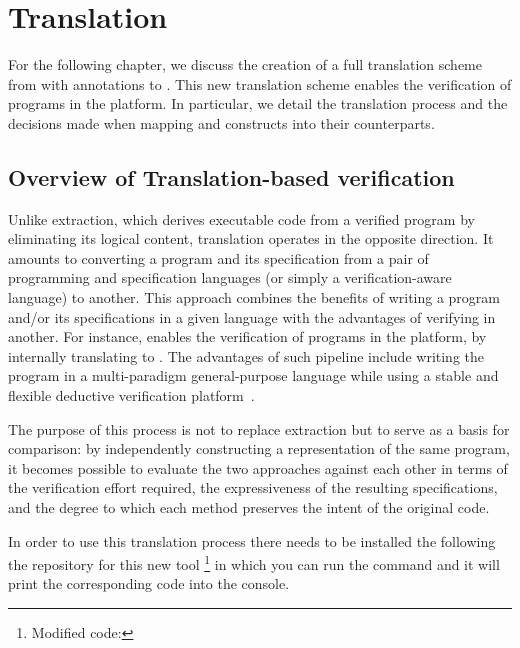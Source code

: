 
%

\chapter{Translation}
\label{cha:Translation}

For the following chapter, we discuss the creation of a full translation scheme from \cml with \gospel annotations to \whyml. This new
translation scheme enables the verification of \cml programs in the \whythree platform. In particular, we detail the translation process
and the decisions made when mapping \cml and \gospel constructs into their \whyml counterparts.

\section{Overview of Translation-based verification}

Unlike extraction, which derives executable code from a verified program by eliminating its logical content, translation operates in the
opposite direction. It amounts to converting a program and its specification from a pair of programming and specification languages (or
simply a verification-aware language) to another. This approach combines the benefits of writing a program and/or its specifications in
a given language with the advantages of verifying in another. For instance, \cameleer enables the verification of \ocaml programs in
the \whythree platform, by internally translating to \whyml. The advantages of such pipeline include writing the program in a multi-paradigm 
general-purpose language while using a stable and flexible deductive verification platform~\cite{Leino10,JacobsSPVPP11,0001SS16}.

The purpose of this process is not to replace extraction but to serve as a basis for comparison: by independently constructing a \whyml
representation of the same program, it becomes possible to evaluate the two approaches against each other in terms of the verification
effort required, the expressiveness of the resulting specifications, and the degree to which each method preserves the intent of the
original code. 

In order to use this translation process there needs to be installed the following the repository for this new tool 
\footnote{Modified \cameleer code: } in which you can run the command
 and it will print the corresponding \whyml code into the console.

